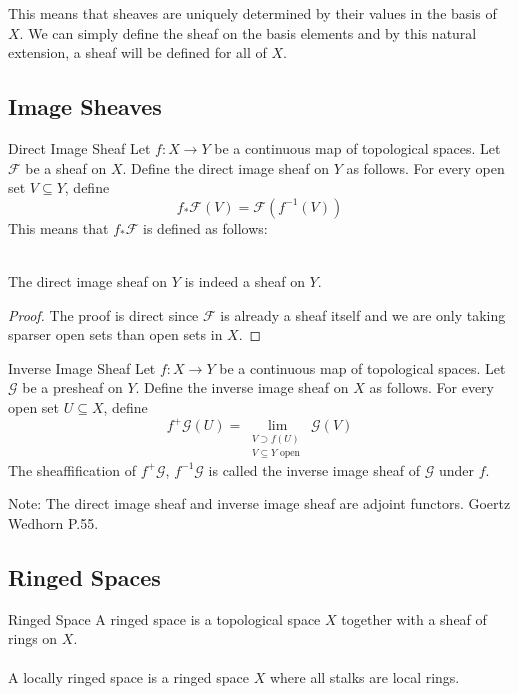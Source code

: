 \documentclass[a4paper]{article}
\begin{document}
This means that sheaves are uniquely determined by their values in the basis of $X$. We can simply define the sheaf on the basis elements and by this natural extension, a sheaf will be defined for all of $X$. 

\subsection{Image Sheaves}
\begin{defn}{Direct Image Sheaf}{} Let $f:X\to Y$ be a continuous map of topological spaces. Let $\mathcal{F}$ be a sheaf on $X$. Define the direct image sheaf on $Y$ as follows. For every open set $V\subseteq Y$, define $$f_\ast\mathcal{F}(V)=\mathcal{F}(f^{-1}(V))$$ This means that $f_\ast\mathcal{F}$ is defined as follows: \\~\\
\end{defn}

\begin{prp}{}{} The direct image sheaf on $Y$ is indeed a sheaf on $Y$. \tcbline
\begin{proof}
The proof is direct since $\mathcal{F}$ is already a sheaf itself and we are only taking sparser open sets than open sets in $X$. 
\end{proof}
\end{prp}

\begin{defn}{Inverse Image Sheaf}{} Let $f:X\to Y$ be a continuous map of topological spaces. Let $\mathcal{G}$ be a presheaf on $Y$. Define the inverse image sheaf on $X$ as follows. For every open set $U\subseteq X$, define $$f^+\mathcal{G}(U)=\lim_{\substack{V\supset f(U)\\V\subseteq Y\text{ open }}}\mathcal{G}(V)$$ The sheaffification of $f^+\mathcal{G}$, $f^{-1}\mathcal{G}$ is called the inverse image sheaf of $\mathcal{G}$ under $f$. 
\end{defn}

Note: The direct image sheaf and inverse image sheaf are adjoint functors. Goertz Wedhorn P.55. 

\subsection{Ringed Spaces}
\begin{defn}{Ringed Space}{} A ringed space is a topological space $X$ together with a sheaf of rings on $X$. \\~\\
A locally ringed space is a ringed space $X$ where all stalks are local rings. 
\end{defn}
\end{document}
